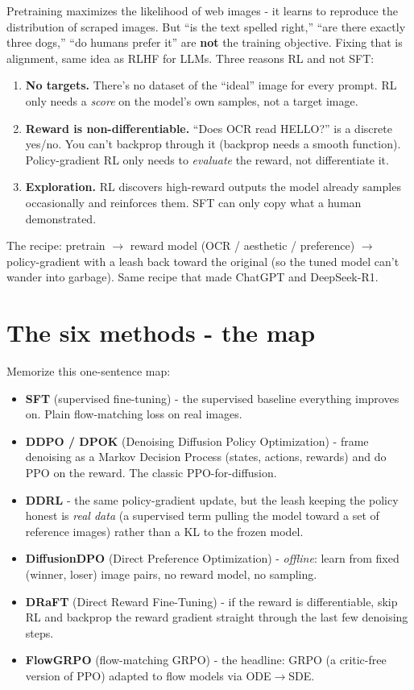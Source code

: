 \documentclass[11pt]{article}
\begin{document}
Pretraining maximizes the likelihood of web images - it learns to reproduce the
distribution of scraped images. But ``is the text spelled right,'' ``are there exactly
three dogs,'' ``do humans prefer it'' are \textbf{not} the training objective. Fixing
that is alignment, same idea as RLHF for LLMs. Three reasons RL and not SFT:
\begin{enumerate}
\item \textbf{No targets.} There's no dataset of the ``ideal'' image for every prompt.
RL only needs a \textit{score} on the model's own samples, not a target image.
\item \textbf{Reward is non-differentiable.} ``Does OCR read HELLO?'' is a discrete
yes/no. You can't backprop through it (backprop needs a smooth function). Policy-gradient
RL only needs to \textit{evaluate} the reward, not differentiate it.
\item \textbf{Exploration.} RL discovers high-reward outputs the model already samples
occasionally and reinforces them. SFT can only copy what a human demonstrated.
\end{enumerate}
The recipe: pretrain $\to$ reward model (OCR / aesthetic / preference) $\to$
policy-gradient with a leash back toward the original (so the tuned model can't wander
into garbage). Same recipe that made ChatGPT and DeepSeek-R1.

\section{The six methods - the map}

Memorize this one-sentence map:
\begin{itemize}
\item \textbf{SFT} (supervised fine-tuning) - the supervised baseline everything
improves on. Plain flow-matching loss on real images.
\item \textbf{DDPO / DPOK} (Denoising Diffusion Policy Optimization) - frame denoising
as a Markov Decision Process (states, actions, rewards) and do PPO on the reward. The
classic PPO-for-diffusion.
\item \textbf{DDRL} - the same policy-gradient update, but the leash keeping the policy
honest is \textit{real data} (a supervised term pulling the model toward a set of
reference images) rather than a KL to the frozen model.
\item \textbf{DiffusionDPO} (Direct Preference Optimization) - \textit{offline}: learn
from fixed (winner, loser) image pairs, no reward model, no sampling.
\item \textbf{DRaFT} (Direct Reward Fine-Tuning) - if the reward is differentiable,
skip RL and backprop the reward gradient straight through the last few denoising steps.
\item \textbf{FlowGRPO} (flow-matching GRPO) - the headline: GRPO (a critic-free
version of PPO) adapted to flow models via ODE$\to$SDE.
\end{itemize}
\end{document}
